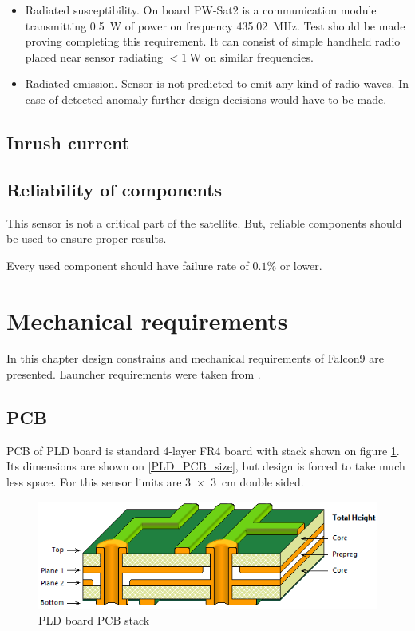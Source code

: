 \begin{itemize}
		\item Radiated susceptibility.
			On board PW-Sat2 is a communication module transmitting \SI{0.5}{\watt} of power on frequency \SI{435.02}{\mega\hertz}. Test should be made proving completing this requirement. It can consist of simple handheld radio placed near sensor radiating $< \SI{1}{\watt}$ on similar frequencies.
			
		\item Radiated emission.
			Sensor is not predicted to emit any kind of radio waves. In case of detected anomaly further design decisions would have to be made.
		
	\end{itemize}


\subsection{Inrush current}

\subsection{Reliability of components}
	This sensor is not a critical part of the satellite. But, reliable components should be used to ensure proper results. 
	
	Every used component should have failure rate of $0.1\si{\percent}$ or lower.


\section{Mechanical requirements}
	In this chapter design constrains and mechanical requirements of Falcon9 are presented. Launcher requirements were taken from \cite{Falcon9_user_manual}.
	
\subsection{PCB}
\label{PCB_description}
	PCB of PLD board is standard 4-layer FR4 board with stack shown on figure \ref{PLD_PCB_stack}. Its dimensions are shown on \ref{PLD_PCB_size}, but design is forced to take much less space. For this sensor limits are \SI{3x3}{\centi\meter} double sided.

	\begin{figure}[H]
		\centering
		\includegraphics[width=0.5\paperwidth]{img/PLD_PCB_stack.png}
		\caption{PLD board PCB stack}
		\label{PLD_PCB_stack}
	\end{figure}	

